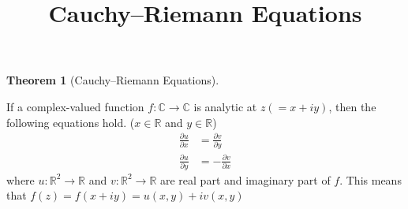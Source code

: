 \documentclass[letterpaper, 12pt]{article}
\title{Cauchy--Riemann Equations}
\date{}
\theoremstyle{custom}
\newtheorem*{theorem}{Theorem}
\begin{document}
\maketitle

\begin{theorem}[Cauchy--Riemann Equations]
\end{theorem}
If a complex-valued function $f: \mathbb{C} \rightarrow \mathbb{C}$ is analytic at $z(=x+iy)$, then the following equations hold. ($x\in \mathbb{R}$ and $y\in \mathbb{R}$)
\begin{align*}
  \frac{\partial u}{\partial x} &= \frac{\partial v}{\partial y} \\
  \frac{\partial u}{\partial y} &= -\frac{\partial v}{\partial x}
\end{align*}
where $u: \mathbb{R}^2 \rightarrow \mathbb{R}$ and $v: \mathbb{R}^2 \rightarrow \mathbb{R}$ are real part and imaginary part of $f$.
This means that $f(z) = f(x+iy) = u(x,y) + iv(x,y)$\\
\end{document}
